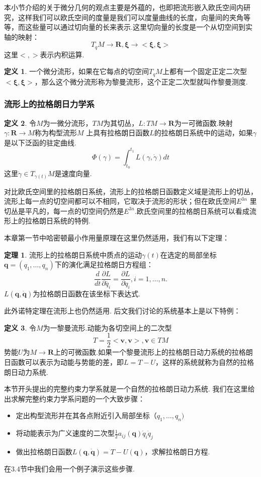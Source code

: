 \documentclass[UTF8,10.5pt,a4paper]{ctexart}
\numberwithin{equation}{section}
\theoremstyle{definition}
\newtheorem{thm}{定理\hspace{0.05pt}}[section]
\theoremstyle{definition}
\newtheorem{dfn}{定义\hspace{0.05pt}}[section]
\begin{document}
\par 本小节介绍的关于微分几何的观点主要是外蕴的，也即把流形嵌入欧氏空间内研究，这样我们可以欧氏空间的度量是我们可以度量曲线的长度，向量间的夹角等等，而这些量可以通过切向量的长来表示.这里切向量的长度是一个从切空间到实轴的映射：
$$T_qM\rightarrow \mathbf{R} , \mathbf{\xi}\rightarrow <\mathbf{\xi},\mathbf{\xi}> $$
这里$<,>$表示内积运算.
\begin{dfn}
一个微分流形，如果在它每点的切空间$T_qM$上都有一个固定正定二次型$<\mathbf{\xi},\mathbf{\xi}> $，那么这个微分流形称为黎曼流形，这个正定二次型就叫作黎曼测度.\cite{AI2}
\end{dfn}
\subsubsection{流形上的拉格朗日力学系}
\begin{dfn}
令$M$为一微分流形，$TM$为其切丛，$L:TM\rightarrow\mathbf{R}$为一可微函数.映射$\gamma:\mathbf{R}\rightarrow M$称为构型流形$M$ 上具有拉格朗日函数$L$的拉格朗日系统中的运动，如果$\gamma$是以下泛函的驻定曲线.
$$\Phi(\gamma)=\int_{t_0}^{t_1}L(\gamma,\dot{\gamma})dt$$
这里$\dot{\gamma}\in T_{\gamma(t)}M$是速度向量.
\end{dfn}
对比欧氏空间里的拉格朗日系统，流形上的拉格朗日函数定义域是流形上的切丛，流形上每一点的切空间都可以不相同，它取决于流形的形状；但在欧氏空间$E^{3n}$ 里切丛是平凡的，每一点的切空间仍然是$E^{3n}$.欧氏空间里的拉格朗日系统可以看成流形上的拉格朗日系统的特例.
\par 本章第一节中哈密顿最小作用量原理在这里仍然适用，我们有以下定理：
\begin{thm}
流形上的拉格朗日系统中质点的运动$\gamma(t)$在选定的局部坐标$\textbf{q}=(q_1,\ldots,q_n)$下的演化满足拉格朗日方程组：
$$\frac{d}{dt}\frac{\partial L}{\partial\dot{q_i}}=\frac{\partial L}{\partial q_i}, i=1,\ldots,n .$$
$L(\textbf{q},\dot{\textbf{q}})$为拉格朗日函数在该坐标下表达式.
\end{thm}
此外诺特定理在流形上也仍然适用.%
后文我们讨论的系统基本上是以下特例：
\begin{dfn}
令$M$为一黎曼流形.动能为各切空间上的二次型
$$T=\frac{1}{2}<\textbf{v},\textbf{v}>  , \textbf{v}\in TM$$
势能$U$为$M\rightarrow \mathbf{R}$上的可微函数.如果一个黎曼流形上的拉格朗日动力系统的拉格朗日函数可以表示为动能与势能的差，即$L=T-U$，这样的系统就称为自然的拉格朗日动力系统.
\end{dfn}
本节开头提出的完整约束力学系就是一个自然的拉格朗日动力系统.
我们在这里给出求解完整约束力学系问题的一个大致步骤：
\begin{itemize}
  \item [(1)]定出构型流形并在其各点附近引入局部坐标$（q_1,\ldots,q_n)$
  \item [(2)]将动能表示为广义速度的二次型$\frac{1}{2}a_{ij}(\textbf{q})\dot{q}_i\dot{q}_j$
  \item [(3)]做出拉格朗日函数$L(\textbf{q},\dot{\textbf{q}})=T-U(\textbf{q})$，求解拉格朗日方程.
\end{itemize}
在3.4节中我们会用一个例子演示这些步骤.
\end{document}

